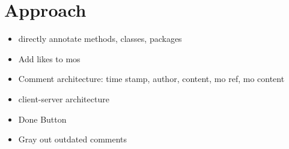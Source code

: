 
\section{Approach}

\begin{itemize}
	\item directly annotate methods, classes, packages
	\item Add likes to mos
	\item Comment architecture: time stamp, author, content, mo ref, mo content
	\item client-server architecture
	\item Done Button
	\item Gray out outdated comments
\end{itemize}
